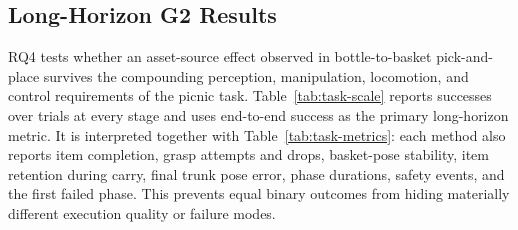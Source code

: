 \documentclass[letterpaper,10pt,conference]{ieeeconf}
\begin{document}
\begin{table}[t]
  \caption{Main real-robot results. Report success with 95\% confidence
  intervals and the bootstrapped real-demonstration saving.}
  \label{tab:main-results}
  \centering
  \small
\end{table}

\subsection{Long-Horizon G2 Results}
RQ4 tests whether an asset-source effect observed in bottle-to-basket pick-and-place
survives the compounding perception, manipulation, locomotion, and control
requirements of the picnic task. Table~\ref{tab:task-scale} reports successes
over trials at every stage and uses end-to-end success as the primary long-horizon
metric. It is interpreted together with Table~\ref{tab:task-metrics}: each method
also reports item completion, grasp attempts and drops, basket-pose stability,
item retention during carry, final trunk pose error, phase durations, safety
events, and the first failed phase. This prevents equal binary outcomes from
hiding materially different execution quality or failure modes.
\end{document}
